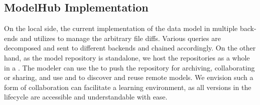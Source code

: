 \documentclass[conference]{IEEEtran}
\begin{document}
\subsection{ModelHub Implementation} %
On the local side, the current implementation of \modelhub\maintains the data model in multiple back-ends and utilizes  to manage the arbitrary file diffs. Various queries are decomposed and sent to different backends and chained accordingly. 
On the other hand, as the model repository is standalone, we host the repositories as a whole in a \modelhub\service. The modeler can use the  to push the repository for archiving, collaborating or sharing, and use  and  to discover and reuse remote models. We envision such a form of collaboration can facilitate a learning environment, as all versions in the lifecycle are accessible and understandable with ease.


\end{document}
